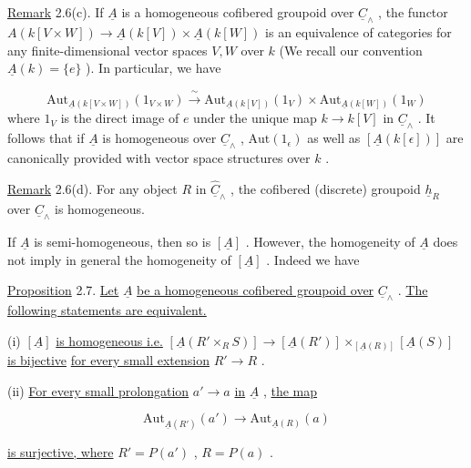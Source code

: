 \underline{Remark} 2.6(c). If  $\underline{A}$  is a homogeneous cofibered groupoid over  $\underline{C}_\wedge$ , the functor $A(k[V \times W]) \to \underline{A}(k[V])\times \underline{A}(k[W])$         is an equivalence of categories for any finite-dimensional vector spaces  $V, W$  over  $k$  (We recall our convention $\underline{A}(k) = \{e\}$  ). In particular, we have

\begin{equation*}
\mathrm{Aut}_{\underline{A}(k[V\times W])}(1_{V\times W}) \xrightarrow{\ \sim\ } \mathrm{Aut}_{\underline{A}(k[V])}(1_V)\times\mathrm{Aut}_{\underline{A}(k[W])}(1_W)
\end{equation*}
where  $1_V$  is the direct image of  $e$  under the unique map  $k \to k[V]$  in  $\underline{C}_\wedge$  . It follows that if  $\underline{A}$  is homogeneous over  $\underline{C}_\wedge$ , $\mathrm{Aut}(1_\epsilon)$  as well as  $[\underline{A}(k[\epsilon])]$ are canonically provided with vector space structures over  $k$  .


\underline{Remark} 2.6(d). For any object  $R$  in  $\hat{\underline{C}}_\wedge$ , the cofibered (discrete) groupoid $\underline{h}_R$  over  $\underline{C}_\wedge$  is homogeneous.

If  $\underline{A}$  is semi-homogeneous, then so is  $[\underline{A}]$ . However, the homogeneity of  $\underline{A}$  does not imply in general the homogeneity of  $[\underline{A}]$ . Indeed we have


\underline{Proposition} 2.7.  \underline{Let}  $\underline{A}$  \underline{be a homogeneous cofibered groupoid over}  $\underline{C}_\wedge$ . \underline{The following statements are equivalent.}

(i)  $[\underline{A}]$  \underline{is homogeneous i.e.}  $[\underline{A}(R' \times_R S)] \longrightarrow [\underline{A}(R')] \times_{[\underline{A}(R)]} [\underline{A}(S)]$  \underline{is bijective} \underline{for every small extension}  $R' \to R$  .

(ii) \underline{For every small prolongation}  $a' \to a$  \underline{in}  $\underline{A}$ , \underline{the map}

\begin{equation*}
\mathrm{Aut}_{\underline{A}(R')}(a') \longrightarrow \mathrm{Aut}_{\underline{A}(R)}(a) 
\end{equation*}


 \underline{is surjective, where}  $R' = P(a')$  ,  $R = P(a)$  .

